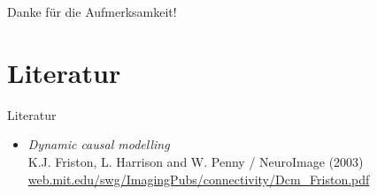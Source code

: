 \documentclass{beamer}
\begin{document}
\begin{frame}
\centering
\huge Danke für die Aufmerksamkeit!
\end{frame}


\section{Literatur}
	\begin{frame}{Literatur}
		\begin{itemize}
			\item \textit{Dynamic causal modelling} \\ {\small K.J. Friston, L. Harrison and W. Penny / NeuroImage (2003)} \\ {\footnotesize \url{web.mit.edu/swg/ImagingPubs/connectivity/Dcm_Friston.pdf}}
		\end{itemize}
	\end{frame}
\end{document}
